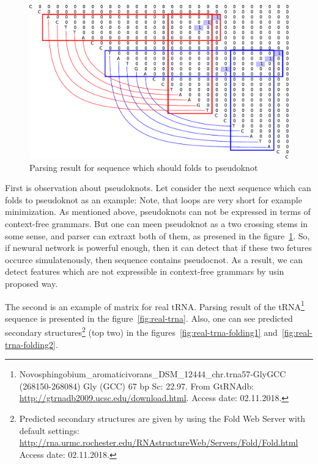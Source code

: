 \documentclass[a4paper,twoside]{article}
\begin{document}
\begin{figure}
\centering
\includegraphics[width=.5\textwidth]{figures/5.pdf}
\caption{Parsing result for sequence which should folds to pseudoknot}
\label{fig:pseudoknot}
\end{figure}

First is observation about pseudoknots. 
Let consider the next sequence which can folds to pseudoknot as an example: {}
Note, that loops are very short for example minimization.
As mentioned above, pseudoknots can not be expressed in terms of context-free grammars. 
But one can meen pseudoknot as a two crossing stems in some sense, and parser can extraxt both of them, as presened in the figure~\ref{fig:pseudoknot}.
So, if newural network is powerful enough, then it can detect that if these two fetures occurce simulatenously, then sequence contains pseudocnot.
As a result, we can detect features which are not expressible in context-free grammars by usin proposed way.

The second is an example of matrix for real tRNA.
Parsing result of the tRNA\footnote{Novosphingobium\_aromaticivorans\_DSM\_12444\_chr.trna57-GlyGCC (268150-268084)  Gly (GCC) 67 bp Sc: 22.97. From GtRNAdb: \url{http://gtrnadb2009.ucsc.edu/download.html}. Access date: 02.11.2018.} sequence {} is presented in the figure~\ref{fig:real-trna}. Also, one can see predicted secondary structures\footnote{Predicted secondary structures are given by using the Fold Web Server with default settings: \url{http://rna.urmc.rochester.edu/RNAstructureWeb/Servers/Fold/Fold.html} Access date: 02.11.2018.} (top two) in the figures~\ref{fig:real-trna-folding1} and~\ref{fig:real-trna-folding2}.
\end{document}

